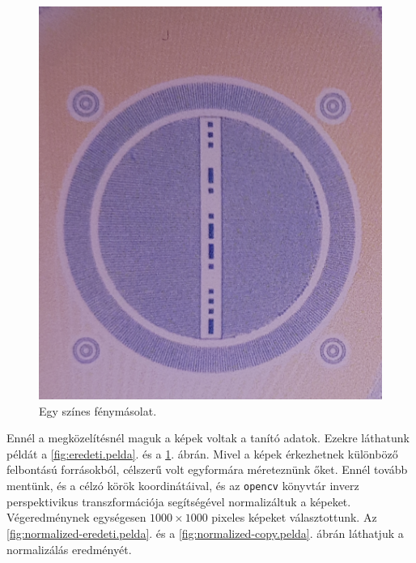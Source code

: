 \begin{figure}[h]
\begin{minipage}[c]{0.5\linewidth}
	\end{minipage}\hfill
	\begin{minipage}[c]{0.5\linewidth}
		\centering
		\includegraphics[width=\textwidth]{img/copy-pelda.png}
		\caption{Egy színes fénymásolat.}
		\label{fig:copy.pelda}
		
	\end{minipage}
	
\end{figure}

Ennél a megközelítésnél maguk a képek voltak a tanító adatok. Ezekre láthatunk példát a  \ref{fig:eredeti.pelda}. és a \ref{fig:copy.pelda}. ábrán.
Mivel a képek érkezhetnek különböző felbontású forrásokból, célszerű volt
egyformára méreteznünk őket. Ennél tovább mentünk, és a célzó körök koordinátáival,
és az \texttt{opencv} könyvtár inverz perspektivikus transzformációja segítségével 
normalizáltuk a képeket. Végeredménynek egységesen $ 1000 \times 1000 $ pixeles képeket
választottunk. Az \ref{fig:normalized-eredeti.pelda}. és a \ref{fig:normalized-copy.pelda}. 
ábrán láthatjuk a normalizálás eredményét.



